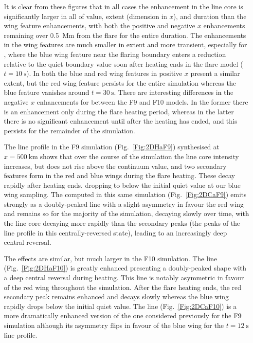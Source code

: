 It is clear from these figures that in all cases the enhancement in the line core is significantly larger in all of value, extent (dimension in $x$), and duration than the wing feature enhancements, with both the positive and negative $x$ enhancements remaining over \SI{0.5}{\mega\metre} from the flare for the entire duration.
The enhancements in the wing features are much smaller in extent and more transient, especially for \Ha{}, where the blue wing feature near the flaring boundary enters a reduction relative to the quiet boundary value soon after heating ends in the flare model ($t=\SI{10}{\second}$).
In \CaLine{} both the blue and red wing features in positive $x$ present a similar extent, but the red wing feature persists for the entire simulation whereas the blue feature vanishes around $t=\SI{30}{\second}$.
There are interesting differences in the negative $x$ enhancements for \CaLine{} between the F9 and F10 models.
In the former there is an enhancement only during the flare heating period, whereas in the latter there is no significant enhancement until after the heating has ended, and this persists for the remainder of the simulation.

The \Ha{} line profile in the F9 simulation (Fig.~\ref{Fig:2DHaF9}) synthesised at $x=\SI{500}{\kilo\metre}$ shows that over the course of the simulation the line core intensity increases, but does not rise above the continuum value, and two secondary features form in the red and blue wings during the flare heating.
These decay rapidly after heating ends, dropping to below the initial quiet value at our blue wing sampling.
The \CaLine{} computed in this same simulation (Fig.~\ref{Fig:2DCaF9}) emits strongly as a doubly-peaked line with a slight asymmetry in favour the red wing and remains so for the majority of the simulation, decaying slowly over time, with the line core decaying more rapidly than the secondary peaks (the peaks of the line profile in this centrally-reversed state), leading to an increasingly deep central reversal.

The effects are similar, but much larger in the F10 simulation.
The \Ha{} line (Fig.~\ref{Fig:2DHaF10}) is greatly enhanced presenting a doubly-peaked shape with a deep central reversal during heating.
This line is notably asymmetric in favour of the red wing throughout the simulation.
After the flare heating ends, the red secondary peak remains enhanced and decays slowly whereas the blue wing rapidly drops below the initial quiet value.
The \CaLine{} line (Fig.~\ref{Fig:2DCaF10}) is a more dramatically enhanced version of the one considered previously for the F9 simulation although its asymmetry flips in favour of the blue wing for the $t=\SI{12}{\second}$ line profile.

